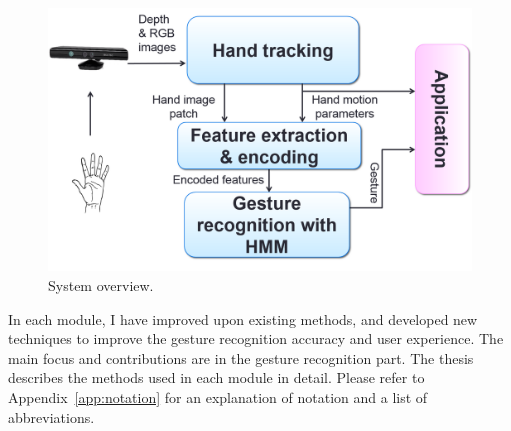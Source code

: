 \begin{figure}[tbh]
\centering
\includegraphics[width=0.7\linewidth]{figures/system_overview.png}
\caption{System overview.}
\label{fig:overview}
\end{figure}

In each module, I have improved upon existing methods, and developed new
techniques to improve the gesture recognition accuracy and user experience. The main focus and contributions are in the gesture
recognition part. The thesis describes the methods used in each module in
detail. Please refer to Appendix~\ref{app:notation} for an explanation of
notation and a list of abbreviations.

